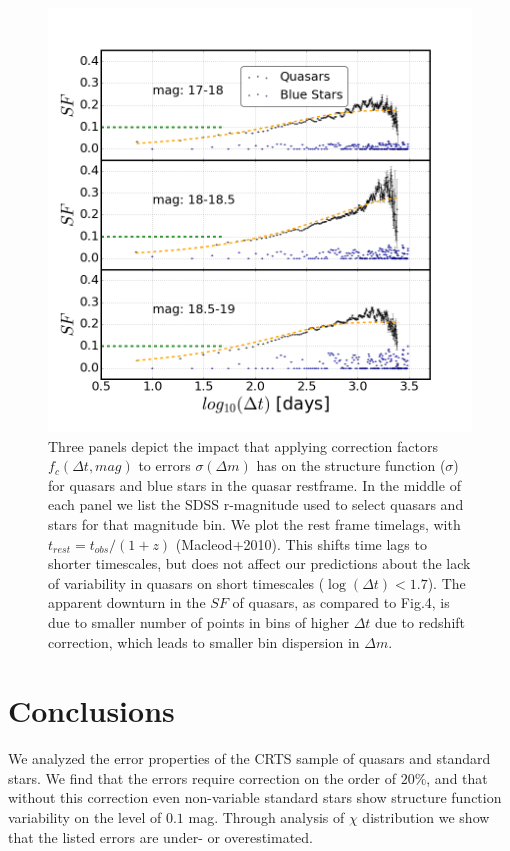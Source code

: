 \documentclass[fleqn,usenatbib]{mnras}  %
\begin{document}
\begin{figure}
\label{fig:5}
 \includegraphics[width=\columnwidth]{Fig_5_SF_QSO_starsB_r_cut_rest.png}
 \caption{Three panels depict the impact that applying correction factors $f_{c}(\Delta t, mag)$ to errors $\sigma(\Delta m)$ has on the structure function ($\sigma$) for quasars and blue stars in the quasar restframe. In the middle of each panel we list the SDSS r-magnitude used to select quasars and stars for that magnitude bin. We plot the rest frame timelags, with $t_{rest} = t_{obs} / (1+z)$ (Macleod+2010). This shifts time lags to shorter timescales, but does not affect our predictions about the lack of variability in quasars on short timescales ($\log(\Delta t) < 1.7$). The apparent downturn in the $SF$ of quasars, as compared to Fig.4, is due to smaller number of points in bins of higher $\Delta t$ due to redshift correction, which leads to smaller bin dispersion in $\Delta m$. }
\end{figure}


\section{Conclusions}
We analyzed the error properties of the CRTS sample of quasars and standard stars.  We find that the errors require correction on the order of $20\%$, and that without this correction even non-variable standard stars show structure function variability on the level of $0.1$ mag. Through analysis of $\chi$ distribution we show that the listed errors are under- or overestimated.  
\end{document}
